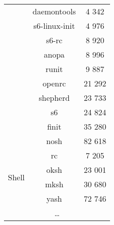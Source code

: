 \begin{table}[!ht]
\begin{tabular}{|c|c|c|}
        \cline{2-3}
        & daemontools \cite{daemontools} & 4 342 \\
        \cline{2-3}
        & s6-linux-init \cite{s6-linux-init} & 4 976 \\
        \cline{2-3}
        & s6-rc \cite{s6-rc} & 8 920 \\
        \cline{2-3}
        & anopa \cite{anopa} & 8 996 \\
        \cline{2-3}
        & runit \cite{runit} & 9 887 \\
        \cline{2-3}
        & openrc \cite{openrc} & 21 292 \\
        \cline{2-3}
        & shepherd \cite{shepherd} & 23 733 \\ %
        \cline{2-3}
        & s6 \cite{s6} & 24 824 \\
        \cline{2-3}
        & finit \cite{finit} & 35 280 \\
        \cline{2-3}
        & nosh \cite{nosh} & 82 618 \\ %
        \hline
        \hline
        \multirow{4}{*}{Shell}
        & rc \cite{rc} & 7 205 \\
        \cline{2-3}
        & oksh \cite{oksh} & 23 001 \\
        \cline{2-3}
        & mksh \cite{mksh} & 30 680 \\
        \cline{2-3}
        & yash \cite{yash} & 72 746 \\
        \hline
        \hline
        \multicolumn{3}{|c|}{\dots} \\
        \hline
    \end{tabular}
\end{table}


\newpage

